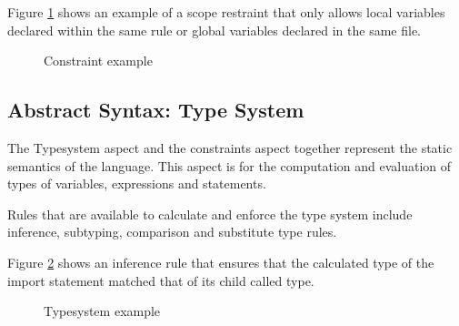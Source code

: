 Figure \ref{fig:constraint_example} shows an example of a scope restraint that only allows local variables declared within the same rule or global variables declared in the same file.

\begin{figure}[h]
    \centering
    \caption{Constraint example}
    \label{fig:constraint_example}
\end{figure}
 
\subsection{Abstract Syntax: Type System}
The Typesystem aspect and the constraints aspect together represent the static semantics of the language.
This aspect is for the computation and evaluation of types of variables, expressions and statements.

Rules that are available to calculate and enforce the type system include inference, subtyping, comparison and substitute type rules.

Figure \ref{fig:typesystem_example} shows an inference rule that ensures that the calculated type of the import statement matched that of its child called type.

\begin{figure}[h]
    \centering
    \caption{Typesystem example}
    \label{fig:typesystem_example}
\end{figure}
 

